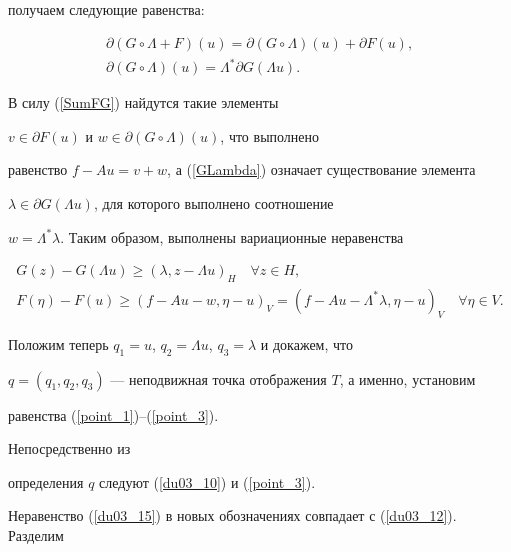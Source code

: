 \begin{pf}
получаем следующие равенства:


\begin{gather}


\partial (G\circ \Lambda+F)(u)=


\partial (G\circ \Lambda)(u)+\partial F(u),\label{SumFG}\\


%


\partial (G\circ \Lambda)(u)=\Lambda^* \partial G(\Lambda u).


\label{GLambda}


\end{gather}


В силу (\ref{SumFG}) найдутся такие элементы 


$v \in \partial F(u) $ и $w \in \partial (G \circ \Lambda)(u)$, что выполнено 


равенство $f-Au=v+w$, а (\ref{GLambda}) означает существование элемента


$\lambda \in \partial G (\Lambda u) $, для которого выполнено соотношение


$w=\Lambda^* \lambda $. Таким образом, выполнены вариационные неравенства


\begin{gather}


G(z)-G(\Lambda u) \geq (\lambda , z-\Lambda u)_H \quad


\forall z \in H,\label{du03_15}\\


%


F(\eta)-F(u) \geq (f-A u- w , \eta-u)_V =


(f-A u- \Lambda ^* \lambda , \eta-u)_V 


\quad \forall \eta \in V.


\label{du03_16}


\end{gather}


Положим теперь $q_1=u$, $q_2=\Lambda u$, $q_3=\lambda$ и докажем, что


$q=(q_1,q_2,q_3)$ --- неподвижная точка отображения $T$, а именно, установим


равенства (\ref{point_1})--(\ref{point_3}).





Непосредственно из


определения $q$ следуют (\ref{du03_10}) и (\ref{point_3}).


Неравенство (\ref{du03_15}) в новых обозначениях совпадает с (\ref{du03_12}). Разделим 



\end{pf}
